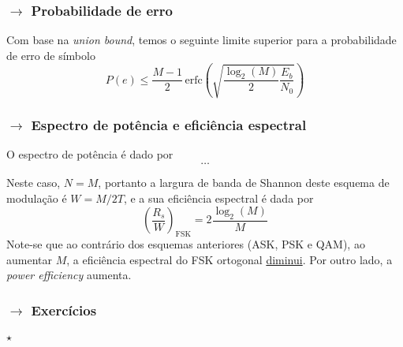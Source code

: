 \subsubsection[5.4.1 Probabilidade de erro]{$\rightarrow$ Probabilidade de erro}

Com base na \textit{union bound}, temos o seguinte limite superior para a probabilidade de erro de símbolo
$$
    P(e) \leq \frac{M-1}{2}\, \text{erfc}\left( \sqrt{\frac{\log_2(M)}{2}\frac{E_b}{N_0}} \right)
$$

\renewcommand*{\thefootnote}{\fnsymbol{footnote}}
\renewcommand*{\thefootnote}{\arabic{footnote}}

\newpage
\subsubsection[5.4.2 Espectro de potência e eficiência espectral]{$\rightarrow$ Espectro de potência e eficiência espectral}

O espectro de potência é dado por
$$
    \pmb{\dots}
$$

\vspace{0.75em}
Neste caso, $N=M$, portanto a largura de banda de Shannon deste esquema de modulação é $W=M/2T$, e a sua eficiência espectral é dada por
$$
    \left(\frac{R_s}{W}\right)_{\text{FSK}} = 2\frac{\log_2(M)}{M}
$$
Note-se que ao contrário dos esquemas anteriores (ASK, PSK e QAM), ao aumentar $M$, a eficiência espectral do FSK ortogonal \underline{diminui}. Por outro lado, a \textit{power efficiency} aumenta.

\subsubsection[5.4.3 Exercícios]{$\pmb{\rightarrow}$ Exercícios}
\paragraph[5.4.3.1 ]{$\pmb{\star}$ }\mbox{}\\


